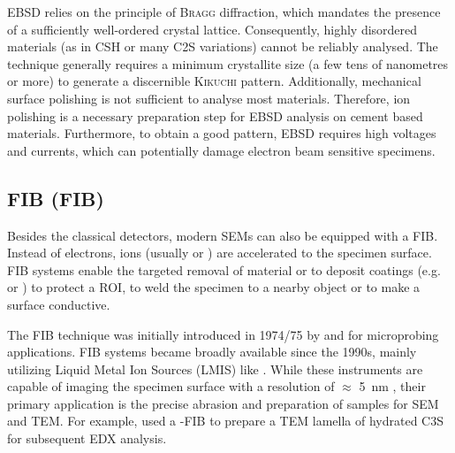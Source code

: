 \ac{EBSD} relies on the principle of \textsc{Bragg} diffraction, which mandates the presence of a sufficiently well-ordered crystal lattice.
Consequently, highly disordered materials (as in \ac{CSH} or many \ac{C2S} variations) cannot be reliably analysed.
The technique generally requires a minimum crystallite size (a few tens of nanometres or more) to generate a discernible \textsc{Kikuchi} pattern.
Additionally, mechanical surface polishing is not sufficient to analyse most materials.
Therefore, ion polishing is a necessary preparation step for \ac{EBSD} analysis on cement based materials.
Furthermore, to obtain a good pattern, \ac{EBSD} requires high voltages and currents, which can potentially damage electron beam sensitive specimens.




\FloatBarrier
\subsection{\Acl*{FIB} (\acs*{FIB})}
\label{sec:lit_fib}

Besides the classical detectors, modern \ac{SEM}s can also be equipped with a \ac{FIB}.
Instead of electrons, ions (usually  or ) are accelerated to the specimen surface.
\ac{FIB} systems enable the targeted removal of material or to deposit coatings (e.g.  or ) to protect a \ac{ROI}, to weld  the specimen to a nearby object or to make a surface conductive.

The \ac{FIB} technique was initially introduced in 1974/75 by \textcite{levi-setti.1974} and \textcite{orloff.1975} for microprobing applications.
\ac{FIB} systems became broadly available since the 1990s, mainly utilizing Liquid Metal Ion Sources (LMIS) like  \cite{volkert.2007}.
While these instruments are capable of imaging the specimen surface with a resolution of $\approx$ \qty{5}{\nano\meter} \cite{orloff.1996}, their primary application is the precise abrasion and preparation of samples for \ac{SEM} and \ac{TEM}.
For example, \textcite{sakalli.2017} used a -\ac{FIB} to prepare a \ac{TEM} lamella of hydrated \ac{C3S} for subsequent \ac{EDX} analysis.

